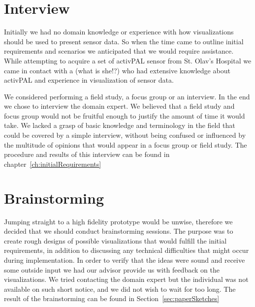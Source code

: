 \section{Interview}
Initially we had no domain knowledge or experience with how visualizations should be used to present sensor data. So when the time came to outline initial requirements and scenarios we anticipated that we would require assistance. While attempting to acquire a set of activPAL sensor from St. Olav's Hospital we came in contact with a (what is she!?) who had extensive knowledge about activPAL and experience in visualization of sensor data. 

We considered performing a field study, a focus group or an interview. In the end we chose to interview the domain expert. We believed that a field study and focus group would not be fruitful enough to justify the amount of time it would take. We lacked a grasp of basic knowledge and terminology in the field that could be covered by a simple interview, without being confused or influenced by the multitude of opinions that would appear in a focus group or field study. The procedure and results of this interview can be found in chapter~\ref{ch:initialRequirements} 
 
\section{Brainstorming}
Jumping straight to a high fidelity prototype would be unwise, therefore we decided that we should conduct brainstorming sessions. The purpose was to create rough designs of possible visualizations that would fulfill the initial requirements, in addition to discussing any technical difficulties that might occur during implementation. In order to verify that the ideas were sound and receive some outside input we had our advisor provide us with feedback on the visualizations. We tried contacting the domain expert but the individual was not available on such short notice, and we did not wish to wait for too long. The result of the brainstorming can be found in Section~\ref{sec:paperSketches}

